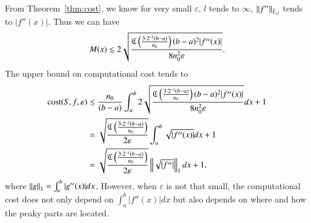 From Theorem~\ref{thm:cost}, we know for very small $\varepsilon$,
$l$ tends to $\infty$, $ \norm[\bar{I}_{x,l}]{f''} $ tends to $|f''(x)|$.
Thus we can have
$$ M(x) \lesssim 2\sqrt{\frac{\fC\left(\frac{3 \cdot 2^{-l}(b-a)}{n_0}\right)  (b-a)^2 |f''(x)|}{8n^2_0\varepsilon}}.$$
The upper bound on computational cost tends to
\begin{align*}
\cost(S,f,\varepsilon)  & \lesssim \frac{n_0}{(b-a)}\int_a^b 2\sqrt{\frac{\fC\left(\frac{3 \cdot 2^{-l}(b-a)}{n_0}\right)  (b-a)^2 |f''(x)|}{8n^2_0\varepsilon}} dx +1 \\
& =\sqrt{\frac{\fC\left(\frac{3 \cdot 2^{-l}(b-a)}{n_0}\right)}{2\varepsilon}}\int_a^b \sqrt{|f''(x)|} dx +1\\
& =\sqrt{\frac{\fC\left(\frac{3 \cdot 2^{-l}(b-a)}{n_0}\right)}{2\varepsilon}}\norm[1]{\sqrt{|f''|}} dx +1,
\end{align*}
where $\norm[1]{g}=\int_a^b |g''(x)| dx$.
However, when $\varepsilon$ is not that small, the computational cost does not only depend on $\int_a^b|f''(x)|dx$ but also depends on where and how the peaky parts are located.\\
